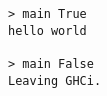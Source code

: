 \begin{repl}\begin{lstlisting}
> main True
hello world

> main False
Leaving GHCi.\end{lstlisting}\end{repl}
